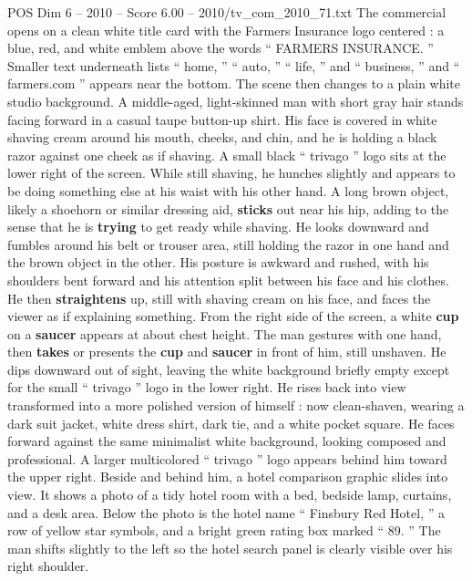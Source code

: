 \begin{textsample}{POS Dim 6 – 2010 – Score 6.00 – 2010/tv\_com\_2010\_71.txt}  \label{ex:f6_pos_087}
The commercial opens on a clean white title card with the Farmers Insurance logo centered : a blue, red, and white emblem above the words “ FARMERS INSURANCE. ” Smaller text underneath lists “ home, ” “ auto, ” “ life, ” and “ business, ” and “ farmers.com ” appears near the bottom.
The scene then changes to a plain white studio background.
A middle-aged, light-skinned man with short gray hair stands facing forward in a casual taupe button-up shirt.
His face is covered in white shaving cream around his mouth, cheeks, and chin, and he is holding a black razor against one cheek as if shaving.
A small black “ trivago ” logo sits at the lower right of the screen.
While still shaving, he hunches slightly and appears to be doing something else at his waist with his other hand.
A long brown object, likely a shoehorn or similar dressing aid, \textbf{sticks} out near his hip, adding to the sense that he is \textbf{trying} to get ready while shaving.
He looks downward and fumbles around his belt or trouser area, still holding the razor in one hand and the brown object in the other.
His posture is awkward and rushed, with his shoulders bent forward and his attention split between his face and his clothes.
He then \textbf{straightens} up, still with shaving cream on his face, and faces the viewer as if explaining something.
From the right side of the screen, a white \textbf{cup} on a \textbf{saucer} appears at about chest height.
The man gestures with one hand, then \textbf{takes} or presents the \textbf{cup} and \textbf{saucer} in front of him, still unshaven.
He dips downward out of sight, leaving the white background briefly empty except for the small “ trivago ” logo in the lower right.
He rises back into view transformed into a more polished version of himself : now clean-shaven, wearing a dark suit jacket, white dress shirt, dark tie, and a white pocket square.
He faces forward against the same minimalist white background, looking composed and professional.
A larger multicolored “ trivago ” logo appears behind him toward the upper right.
Beside and behind him, a hotel comparison graphic slides into view.
It shows a photo of a tidy hotel room with a bed, bedside lamp, curtains, and a desk area.
Below the photo is the hotel name “ Finsbury Red Hotel, ” a row of yellow star symbols, and a bright green rating box marked “ 89. ” The man shifts slightly to the left so the hotel search panel is clearly visible over his right shoulder.

\end{textsample}
